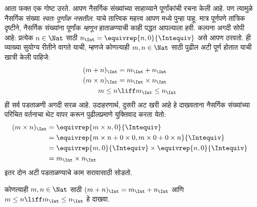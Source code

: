 \documentclass[../../../include/open-logic-section]{subfiles}
\begin{document}
आता फक्त एक गोष्ट उरते. आपण नैसर्गिक संख्यांच्या साहाय्याने
पूर्णांकांची रचना केली आहे. पण त्यामुळे नैसर्गिक संख्या \emph{स्वतः
पूर्णांक नसतील}. याचे तात्त्विक महत्त्व आपण  मध्ये
पुन्हा पाहू. मात्र पूर्णपणे तांत्रिक दृष्टीने, नैसर्गिक संख्यांना
पूर्णांक \emph{म्हणून} हाताळण्याची काही पद्धत आपल्याला हवी. कल्पना अगदी
सोपी आहे: प्रत्येक $n \in \Nat$ साठी $n_\Int = \equivrep{n, 0}{\Intequiv}$
असे आपण ठरवतो. ही व्याख्या सुयोग्य रीतीने वागते याची, म्हणजे कोणत्याही
$m, n \in \Nat$ साठी पुढील अटी पूर्ण होतात याची खात्री केली पाहिजे:
\begin{align*}
	(m + n)_\Int &= m_\Int + n_\Int\\
	(m \times n)_\Int &= m_\Int \times n_\Int\\
	m \leq n &\liff m_\Int \leq n_\Int
\end{align*}
ही सर्व पडताळणी अगदी सरळ आहे. उदाहरणार्थ, दुसरी अट खरी आहे हे
दाखवताना नैसर्गिक संख्यांच्या परिचित वर्तनाचा थेट वापर करून पुढीलप्रमाणे
युक्तिवाद करता येतो:
	\begin{align*}
		(m \times n)_\Int  &= \equivrep{m \times n, 0}{\Intequiv} \\
		&= \equivrep{m \times n + 0 \times 0, m \times 0 + 0 \times n}{\Intequiv} \\
		&= \equivrep{m, 0}{\Intequiv} \times \equivrep{n, 0}{\Intequiv} \\
		&= m_\Int \times n_\Int
	\end{align*}
इतर दोन अटी पडताळण्याचे काम सरावासाठी सोडतो.
\begin{prob}
	कोणत्याही $m, n \in \Nat$ साठी $(m + n)_\Int = m_\Int + n_\Int$ आणि $m \leq n \liff m_\Int \leq n_\Int$ हे दाखवा.
\end{prob}
\end{document}
